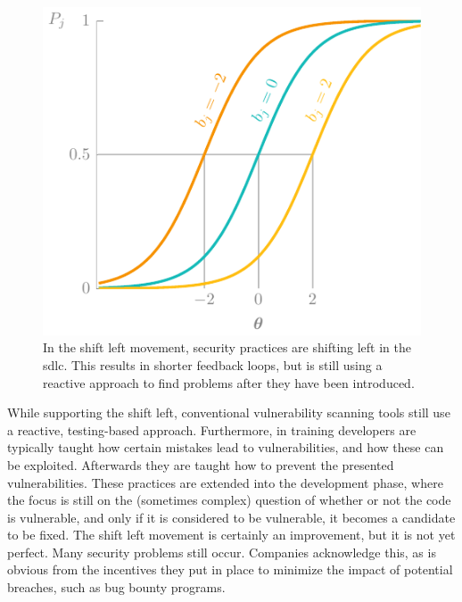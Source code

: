 \begin{figure}
    \centering
    \includegraphics[page=15]{03-education/figures/tikzfigures.pdf}
  \caption[Shift left movement]{In the shift left movement, security practices are shifting left in the \gls{sdlc}. This results in shorter feedback loops, but is still using a reactive approach to find problems after they have been introduced.}
  \label{fig:shiftleft} 
\end{figure}

While supporting the shift left, conventional \gls{vulnerability} scanning tools still use a reactive, testing-based approach. Furthermore, in training developers are typically taught how certain mistakes lead to vulnerabilities, and how these can be exploited. Afterwards they are taught how to prevent the presented vulnerabilities. These practices are extended into the development phase, where the focus is still on the (sometimes complex) question of whether or not the code is vulnerable, and only if it is considered to be vulnerable, it becomes a candidate to be fixed. The shift left movement is certainly an improvement, but it is not yet perfect. Many security problems still occur. Companies acknowledge this, as is obvious from the incentives they put in place to minimize the impact of potential breaches, such as bug bounty programs.


